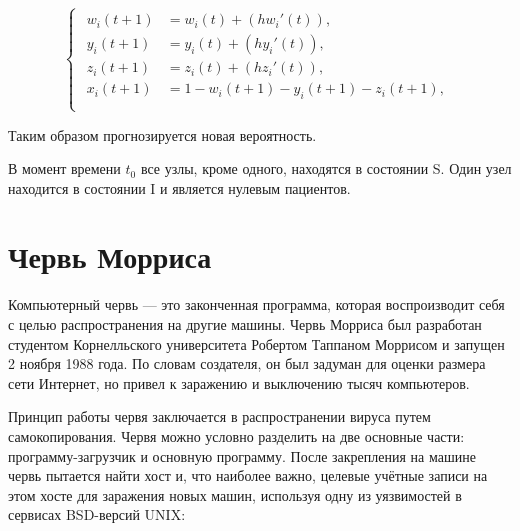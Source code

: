 \documentclass[
  english,
  russian,
  12pt,
  a4paper,
]{phdthesr}
\begin{document}
\[
\begin{cases}
\begin{aligned}
w_i(t+1) &= w_i(t) + (hw_i'(t)),\\
y_i(t+1) &= y_i(t) + (hy_i'(t)),\\
z_i(t+1) &= z_i(t) + (hz_i'(t)),\\
x_i(t+1) &= 1 - w_i(t+1) - y_i(t+1) - z_i(t+1),\\
\end{aligned}
\end{cases}
\]

Таким образом прогнозируется новая вероятность.

В момент времени \(t_0\) все узлы, кроме одного, находятся в состоянии
S. Один узел находится в состоянии I и является нулевым пациентов.

\section{Червь
Морриса}\label{ux447ux435ux440ux432ux44c-ux43cux43eux440ux440ux438ux441ux430}

Компьютерный червь --- это законченная программа, которая воспроизводит
себя с целью распространения на другие машины. Червь Морриса
\autocite{Orman2003} был разработан студентом Корнелльского университета
Робертом Таппаном Моррисом и запущен 2 ноября 1988 года. По словам
создателя, он был задуман для оценки размера сети Интернет, но привел к
заражению и выключению тысяч компьютеров.

Принцип работы червя заключается в распространении вируса путем
самокопирования. Червя можно условно разделить на две основные части:
программу-загрузчик и основную программу. После закрепления на машине
червь пытается найти хост и, что наиболее важно, целевые учётные записи
на этом хосте для заражения новых машин, используя одну из уязвимостей в
сервисах BSD-версий UNIX:
\end{document}
